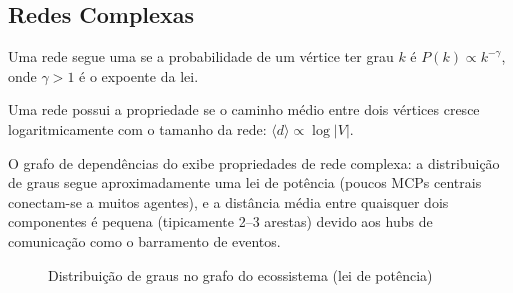 \subsection{Redes Complexas}
\begin{definicao}
Uma rede segue uma  se a probabilidade de um
vértice ter grau $k$ é $P(k) \propto k^{-\gamma}$, onde $\gamma > 1$ é o
expoente da lei.
\end{definicao}
\begin{definicao}
Uma rede possui a propriedade  se o caminho médio
entre dois vértices cresce logaritmicamente com o tamanho da rede:
$\langle d \rangle \propto \log |V|$.
\end{definicao}
\begin{exemplo}
O grafo de dependências do \opencodeeco{} exibe propriedades de rede
complexa: a distribuição de graus segue aproximadamente uma lei de
potência (poucos MCPs centrais conectam-se a muitos agentes), e a
distância média entre quaisquer dois componentes é pequena (tipicamente
2--3 arestas) devido aos hubs de comunicação como o barramento de
eventos.
\end{exemplo}
\begin{figure}[htb]
\centering
\caption{Distribuição de graus no grafo do ecossistema (lei de potência)}
\label{fig:lei-potencia}
\end{figure}
